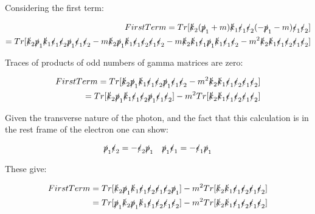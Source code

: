 \documentclass[a4]{article}
\begin{document}
    Considering the first term:

    \begin{eqnarray}
        First Term = Tr [\slashed{k}_2 (\slashed{p}_1 + m) \slashed{k}_1 \slashed{\epsilon}_1 \slashed{\epsilon}_2 (- \slashed{p}_1 - m) \slashed{\epsilon}_1 \slashed{\epsilon}_2] \\
        = Tr [\slashed{k}_2 \slashed{p}_1 \slashed{k}_1 \slashed{\epsilon}_1 \slashed{\epsilon}_2 \slashed{p}_1 \slashed{\epsilon}_1 \slashed{\epsilon}_2 - m \slashed{k}_2 \slashed{p}_1 \slashed{k}_1 \slashed{\epsilon}_1 \slashed{\epsilon}_2 \slashed{\epsilon}_1 \slashed{\epsilon}_2 - m \slashed{k}_2 \slashed{k}_1 \slashed{\epsilon}_1 \slashed{p}_1 \slashed{k}_1 \slashed{\epsilon}_1 \slashed{\epsilon}_2 - m^2 \slashed{k}_2 \slashed{k}_1 \slashed{\epsilon}_1 \slashed{\epsilon}_2 \slashed{\epsilon}_1 \slashed{\epsilon}_2]
    \end{eqnarray}

    Traces of products of odd numbers of gamma matrices are zero:

    \begin{eqnarray}
        First Term = Tr [\slashed{k}_2 \slashed{p}_1 \slashed{k}_1 \slashed{\epsilon}_1 \slashed{\epsilon}_2 \slashed{p}_1 \slashed{\epsilon}_1 \slashed{\epsilon}_2 - m^2 \slashed{k}_2 \slashed{k}_1 \slashed{\epsilon}_1 \slashed{\epsilon}_2 \slashed{\epsilon}_1 \slashed{\epsilon}_2] \\
        = Tr [\slashed{k}_2 \slashed{p}_1 \slashed{k}_1 \slashed{\epsilon}_1 \slashed{\epsilon}_2 \slashed{p}_1 \slashed{\epsilon}_1 \slashed{\epsilon}_2] - m^2 Tr [\slashed{k}_2 \slashed{k}_1 \slashed{\epsilon}_1 \slashed{\epsilon}_2 \slashed{\epsilon}_1 \slashed{\epsilon}_2]
    \end{eqnarray}

    Given the transverse nature of the photon, and the fact that this calculation is in the rest frame of the electron one can show:

    \begin{equation}
        \slashed{p}_1 \slashed{\epsilon}_2 = - \slashed{\epsilon}_2 \slashed{p}_1 \quad \slashed{p}_1 \slashed{\epsilon}_1 = - \slashed{\epsilon}_1 \slashed{p}_1
    \end{equation}

    These give:

    \begin{eqnarray}
        First Term = Tr [\slashed{k}_2 \slashed{p}_1 \slashed{k}_1 \slashed{\epsilon}_1 \slashed{\epsilon}_2 \slashed{\epsilon}_1 \slashed{\epsilon}_2 \slashed{p}_1] - m^2 Tr [\slashed{k}_2 \slashed{k}_1 \slashed{\epsilon}_1 \slashed{\epsilon}_2 \slashed{\epsilon}_1 \slashed{\epsilon}_2] \\
        = Tr [\slashed{p}_1 \slashed{k}_2 \slashed{p}_1 \slashed{k}_1 \slashed{\epsilon}_1 \slashed{\epsilon}_2 \slashed{\epsilon}_1 \slashed{\epsilon}_2] - m^2 Tr [\slashed{k}_2 \slashed{k}_1 \slashed{\epsilon}_1 \slashed{\epsilon}_2 \slashed{\epsilon}_1 \slashed{\epsilon}_2]
    \end{eqnarray}
\end{document}
